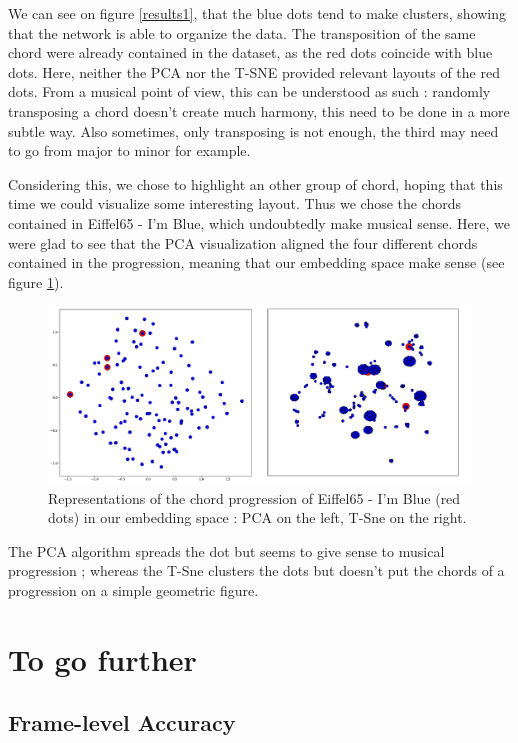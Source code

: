 \documentclass{article}
\begin{document}
We can see on figure \ref{results1}, that the blue dots tend to make clusters, showing that the network is able to organize the data. The transposition of the same chord were already contained in the dataset, as the red dots coincide with blue dots. Here, neither the PCA nor the T-SNE provided relevant layouts of the red dots. From a musical point of view, this can be understood as such : randomly transposing a chord doesn't create much harmony, this need to be done in a more subtle way. Also sometimes, only transposing is not enough, the third may need to go from major to minor for example. 

Considering this, we chose to highlight an other group of chord, hoping that this time we could visualize some interesting layout. Thus we chose the chords contained in Eiffel65 - I'm Blue, which undoubtedly make musical sense. Here, we were glad to see that the PCA visualization aligned the four different chords contained in the progression, meaning that our embedding space make sense (see figure \ref{fig:results2}).

\begin{figure}[H]
\centering
\includegraphics[width =1\textwidth]{T_Sne_Eiffel.png}
\caption{Representations of the chord progression of Eiffel65 - I'm Blue (red dots) in our embedding space : PCA on the left, T-Sne on the right.}
\label{fig:results2}
\end{figure}

The PCA algorithm spreads the dot but seems to give sense to musical progression ; whereas the T-Sne clusters the dots but doesn't put the chords of a progression on a simple geometric figure.

\section{To go further}

\subsection{Frame-level Accuracy}
\end{document}
